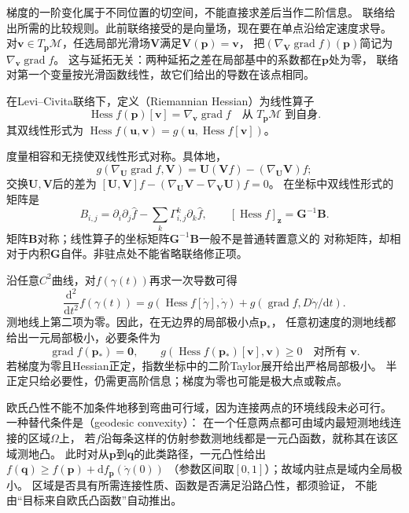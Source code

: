 梯度的一阶变化属于不同位置的切空间，不能直接求差后当作二阶信息。
联络给出所需的比较规则。此前联络接受的是向量场，现在要在单点沿给定速度求导。
对$\bm v\in T_{\bm p}\mathcal M$，任选局部光滑场$\bm V$满足$\bm V(\bm p)=\bm v$，
把$(\nabla_{\bm V}\operatorname{grad}f)(\bm p)$简记为$\nabla_{\bm v}\operatorname{grad}f$。
这与延拓无关：两种延拓之差在局部基中的系数都在$\bm p$处为零，
联络对第一个变量按光滑函数线性，故它们给出的导数在该点相同。
\begin{definition}
\label{def:geometry-riemannian-hessian}
在Levi--Civita联络下，定义（Riemannian Hessian）为线性算子
\[
 \operatorname{Hess}f(\bm p)[\bm v]
 =\nabla_{\bm v}\operatorname{grad}f
 \quad\text{从 }T_{\bm p}\mathcal M\text{ 到自身}.
\]
其双线性形式为
$\operatorname{Hess}f(\bm u,\bm v)
=g(\bm u,\operatorname{Hess}f[\bm v])$。
\end{definition}
度量相容和无挠使双线性形式对称。具体地，
\[
 g(\nabla_{\bm U}\operatorname{grad}f,\bm V)
 =\bm U(\bm V f)-(\nabla_{\bm U}\bm V)f;
\]
交换$\bm U,\bm V$后的差为
$[\bm U,\bm V]f-(\nabla_{\bm U}\bm V-\nabla_{\bm V}\bm U)f=0$。
在坐标中双线性形式的矩阵是
\begin{equation}
 B_{i,j}=\partial_i\partial_j\widehat f
             -\sum_k\Gamma^k_{i,j}\partial_k\widehat f,
 \qquad [\operatorname{Hess}f]_{\bm z}=\bm G^{-1}\bm B.
 \label{eq:geometry-hessian-coordinates}
\end{equation}
矩阵$\bm B$对称；线性算子的坐标矩阵$\bm G^{-1}\bm B$一般不是普通转置意义的
对称矩阵，却相对于内积$\bm G$自伴。非驻点处不能省略联络修正项。

沿任意$C^2$曲线，对$f(\gamma(t))$再求一次导数可得
\begin{equation}
 \frac{\mathrm d^2}{\mathrm dt^2}f(\gamma(t))
 =g(\operatorname{Hess}f[\dot\gamma],\dot\gamma)
   +g(\operatorname{grad}f,D\dot\gamma/\mathrm dt).
 \label{eq:geometry-function-second-derivative}
\end{equation}
测地线上第二项为零。因此，在无边界的局部极小点$\bm p_*$，
任意初速度的测地线都给出一元局部极小，必要条件为
\[
 \operatorname{grad}f(\bm p_*)=\bm0,\qquad
 g(\operatorname{Hess}f(\bm p_*)[\bm v],\bm v)\geq0
 \quad\text{对所有 }\bm v.
\]
若梯度为零且Hessian正定，指数坐标中的二阶Taylor展开给出严格局部极小。
半正定只给必要性，仍需更高阶信息；梯度为零也可能是极大点或鞍点。

欧氏凸性不能不加条件地移到弯曲可行域，因为连接两点的环境线段未必可行。
一种替代条件是（geodesic convexity）：
在一个任意两点都可由域内最短测地线连接的区域$\Omega$上，
若$f$沿每条这样的仿射参数测地线都是一元凸函数，就称其在该区域测地凸。
此时对从$\bm p$到$\bm q$的此类路径，一元凸性给出
$f(\bm q)\geq f(\bm p)+\mathrm df_{\bm p}(\dot\gamma(0))$
（参数区间取$[0,1]$）；故域内驻点是域内全局极小。
区域是否具有所需连接性质、函数是否满足沿路凸性，都须验证，
不能由“目标来自欧氏凸函数”自动推出。

